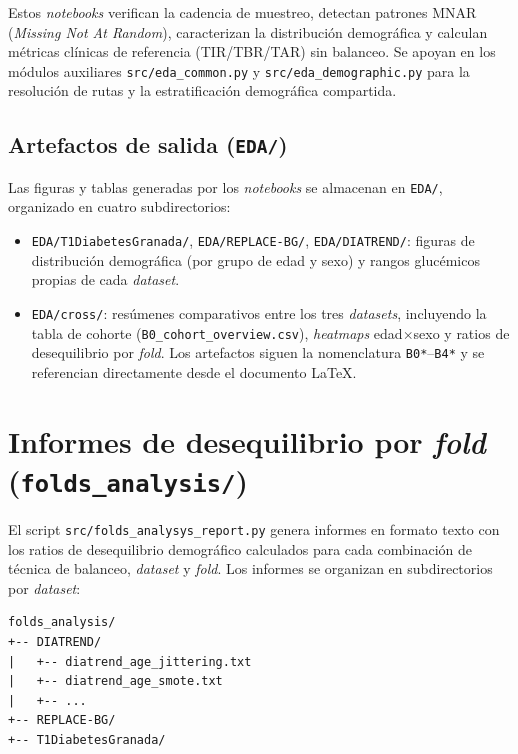 Estos \textit{notebooks} verifican la cadencia de muestreo, detectan
patrones MNAR (\textit{Missing Not At Random}), caracterizan la
distribución demográfica y calculan métricas clínicas de referencia
(TIR/TBR/TAR) sin balanceo. Se apoyan en los módulos auxiliares
\texttt{src/eda\_common.py} y \texttt{src/eda\_demographic.py} para la
resolución de rutas y la estratificación demográfica compartida.

\subsection{Artefactos de salida (\texttt{EDA/})}
\label{subsec:anexo_eda_artefactos}

Las figuras y tablas generadas por los \textit{notebooks} se almacenan
en \texttt{EDA/}, organizado en cuatro subdirectorios:

\begin{itemize}
    \item \texttt{EDA/T1DiabetesGranada/}, \texttt{EDA/REPLACE-BG/},
    \texttt{EDA/DIATREND/}: figuras de distribución demográfica (por
    grupo de edad y sexo) y rangos glucémicos propias de cada
    \textit{dataset}.
    \item \texttt{EDA/cross/}: resúmenes comparativos entre los tres
    \textit{datasets}, incluyendo la tabla de cohorte
    (\texttt{B0\_cohort\_overview.csv}), \textit{heatmaps}
    edad$\times$sexo y ratios de desequilibrio por \textit{fold}. Los
    artefactos siguen la nomenclatura \texttt{B0*}--\texttt{B4*} y se
    referencian directamente desde el documento \LaTeX.
\end{itemize}

\section{Informes de desequilibrio por \textit{fold}
         (\texttt{folds\_analysis/})}
\label{sec:anexo_folds_analysis}

El script \texttt{src/folds\_analysys\_report.py} genera informes en
formato texto con los ratios de desequilibrio demográfico calculados para
cada combinación de técnica de balanceo, \textit{dataset} y
\textit{fold}. Los informes se organizan en subdirectorios por
\textit{dataset}:

\begin{verbatim}
folds_analysis/
+-- DIATREND/
|   +-- diatrend_age_jittering.txt
|   +-- diatrend_age_smote.txt
|   +-- ...
+-- REPLACE-BG/
+-- T1DiabetesGranada/
\end{verbatim}

